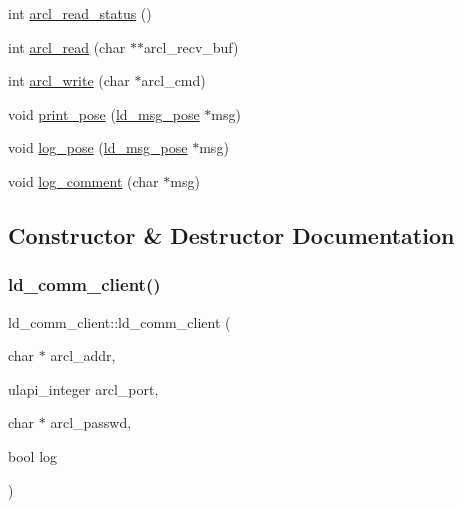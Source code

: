 \begin{DoxyCompactItemize}
\item 
int \hyperlink{classld__comm__client_aa6ff20939ad36ccbe390d1c3d9b1b242}{arcl\+\_\+read\+\_\+status} ()
\item 
int \hyperlink{classld__comm__client_ad43c866e91c88f9dfd7e50fdec941607}{arcl\+\_\+read} (char $\ast$$\ast$arcl\+\_\+recv\+\_\+buf)
\item 
int \hyperlink{classld__comm__client_af044c54c00fe8b8f1528eb094b11ad88}{arcl\+\_\+write} (char $\ast$arcl\+\_\+cmd)
\item 
void \hyperlink{classld__comm__client_a29a4395433e6f9d9ec7c3589de7ae211}{print\+\_\+pose} (\hyperlink{structld__msg__pose}{ld\+\_\+msg\+\_\+pose} $\ast$msg)
\item 
void \hyperlink{classld__comm__client_a2b9b335282497b7b52b7f9a0e624ffe9}{log\+\_\+pose} (\hyperlink{structld__msg__pose}{ld\+\_\+msg\+\_\+pose} $\ast$msg)
\item 
void \hyperlink{classld__comm__client_a8e2124bb6da72ba99ab9d713510e2303}{log\+\_\+comment} (char $\ast$msg)
\end{DoxyCompactItemize}


\subsection{Constructor \& Destructor Documentation}
\mbox{\label{classld__comm__client_abc88de149791710a26470a290de031ef}} 
\subsubsection{\texorpdfstring{ld\+\_\+comm\+\_\+client()}{ld\_comm\_client()}}
{\footnotesize\ttfamily ld\+\_\+comm\+\_\+client\+::ld\+\_\+comm\+\_\+client (\begin{DoxyParamCaption}\item[{char $\ast$}]{arcl\+\_\+addr,  }\item[{ulapi\+\_\+integer}]{arcl\+\_\+port,  }\item[{char $\ast$}]{arcl\+\_\+passwd,  }\item[{bool}]{log }\end{DoxyParamCaption})}

